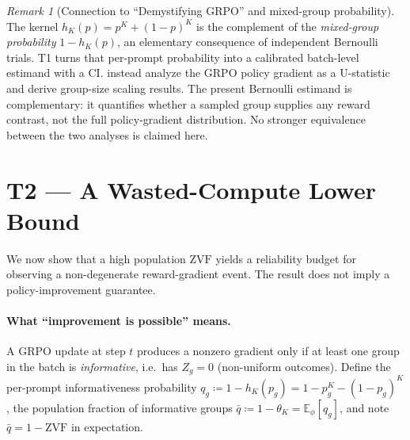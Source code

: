 \documentclass[11pt]{article}
\theoremstyle{plain}
\theoremstyle{definition}
\theoremstyle{remark}
\newtheorem{remark}{Remark}
\newcommand{\ZVF}{\ensuremath{\mathrm{ZVF}}}
\newcommand{\E}{\mathbb{E}}
\newcommand{\1}{\mathbb{1}}
\begin{document}
\begin{remark}[Connection to ``Demystifying GRPO'' and mixed-group probability]
\label{rem:connections}
The kernel $h_K(p)=p^K+(1-p)^K$ is the complement of the \emph{mixed-group
probability} $1-h_K(p)$, an elementary consequence of independent Bernoulli
trials. T1 turns that per-prompt probability into a calibrated batch-level
estimand with a CI. \citet{zhou2026demystifyinggrpo} instead analyze the GRPO
policy gradient as a U-statistic and derive group-size scaling results. The
present Bernoulli estimand is complementary: it quantifies whether a sampled
group supplies any reward contrast, not the full policy-gradient distribution.
No stronger equivalence between the two analyses is claimed here.
\end{remark}

\section{T2 --- A Wasted-Compute Lower Bound}\label{sec:T2}
We now show that a high population \ZVF{} yields a reliability budget for
observing a non-degenerate reward-gradient event. The result does not imply a
policy-improvement guarantee.

\paragraph{What ``improvement is possible'' means.} A GRPO update at step $t$
produces a nonzero gradient only if at least one group in the batch is
\emph{informative}, i.e.\ has $Z_g=0$ (non-uniform outcomes). Define the
per-prompt informativeness probability $q_g \coloneqq 1-h_K(p_g) =
1-p_g^K-(1-p_g)^K$, the population fraction of informative groups
$\bar q \coloneqq 1-\theta_K = \E_\phi[q_g]$, and note $\bar q = 1 - \ZVF$ in
expectation.
\end{document}
